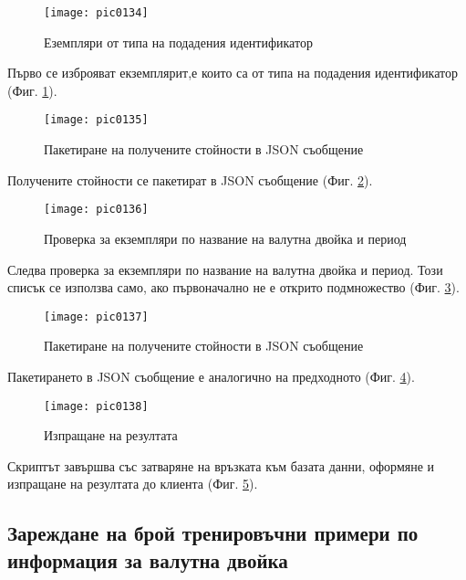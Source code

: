 \begin{figure}[h]
  \centering
  \texttt{[image: pic0134]}
  \caption{Еземпляри от типа на подадения идентификатор}
\label{fig:pic0134}
\end{figure}
\FloatBarrier

Първо се изброяват екземплярит,е които са от типа на подадения идентификатор (Фиг. \ref{fig:pic0134}).

\begin{figure}[h]
  \centering
  \texttt{[image: pic0135]}
  \caption{Пакетиране на получените стойности в JSON съобщение}
\label{fig:pic0135}
\end{figure}
\FloatBarrier

Получените стойности се пакетират в JSON съобщение (Фиг. \ref{fig:pic0135}). 

\begin{figure}[h]
  \centering
  \texttt{[image: pic0136]}
  \caption{Проверка за екземпляри по название на валутна двойка и период}
\label{fig:pic0136}
\end{figure}
\FloatBarrier

Следва проверка за екземпляри по название на валутна двойка и период. Този списък се използва само, ако първоначално не е открито подмножество (Фиг. \ref{fig:pic0136}).

\begin{figure}[h]
  \centering
  \texttt{[image: pic0137]}
  \caption{Пакетиране на получените стойности в JSON съобщение}
\label{fig:pic0137}
\end{figure}
\FloatBarrier

Пакетирането в JSON съобщение е аналогично на предходното (Фиг. \ref{fig:pic0137}).

\begin{figure}[h]
  \centering
  \texttt{[image: pic0138]}
  \caption{Изпращане на резултата}
\label{fig:pic0138}
\end{figure}
\FloatBarrier

Скриптът завършва със затваряне на връзката към базата данни, оформяне и изпращане на резултата до клиента (Фиг. \ref{fig:pic0138}).

\subsection{Зареждане на брой тренировъчни примери по информация за валутна двойка}


